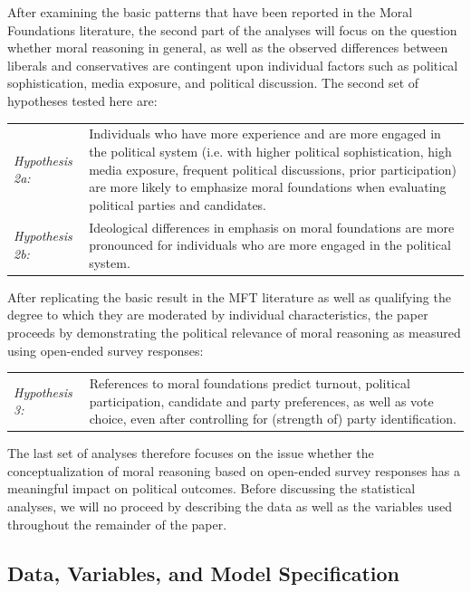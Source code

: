 \documentclass[12pt]{article}
\begin{document}
After examining the basic patterns that have been reported in the Moral Foundations literature, the second part of the analyses will focus on the question whether moral reasoning in general, as well as the observed differences between liberals and conservatives are contingent upon individual factors such as political sophistication, media exposure, and political discussion. The second set of hypotheses tested here are:

\vspace{0.3cm}
\begin{tabular}{lp{12cm}}
\textsl{Hypothesis 2a:} & Individuals who have more experience and are more engaged in the political system (i.e. with higher political sophistication, high media exposure, frequent political discussions, prior participation) are more likely to emphasize moral foundations when evaluating political parties and candidates. \\
\textsl{Hypothesis 2b:} & Ideological differences in emphasis on moral foundations are more pronounced for individuals who are more engaged in the political system.
\end{tabular}
\vspace{0.5cm}

After replicating the basic result in the MFT literature as well as qualifying the degree to which they are moderated by individual characteristics, the paper proceeds by demonstrating the political relevance of moral reasoning as measured using open-ended survey responses:

\vspace{0.3cm}
\begin{tabular}{lp{12cm}}
\textsl{Hypothesis 3:} & References to moral foundations predict turnout, political participation, candidate and party preferences, as well as vote choice, even after controlling for (strength of) party identification.
\end{tabular}
\vspace{0.5cm}

The last set of analyses therefore focuses on the issue whether the conceptualization of moral reasoning based on open-ended survey responses has a meaningful impact on political outcomes. Before discussing the statistical analyses, we will no proceed by describing the data as well as the variables used throughout the remainder of the paper.


\subsection{Data, Variables, and Model Specification}
\end{document}
